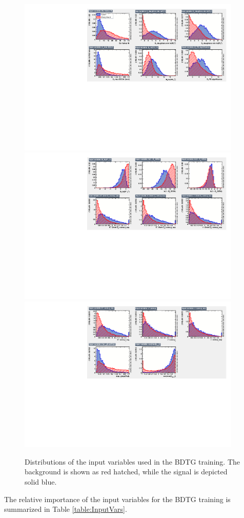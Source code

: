 \begin{figure}[h]
\includegraphics[height=6.cm,width=0.95\textwidth]{figs/BDT_Input_1.pdf}
\includegraphics[height=6.cm,width=0.95\textwidth]{figs/BDT_Input_2.pdf}
\includegraphics[height=6.cm,width=0.95\textwidth]{figs/BDT_Input_3.pdf}
\caption{Distributions of the input variables used in the BDTG training. The background is shown as red hatched, while the signal is depicted solid blue.}
\label{fig:BDT_Input_1}
\end{figure}


The relative importance of the input variables for the BDTG training is summarized in Table \ref{table:InputVars}.

